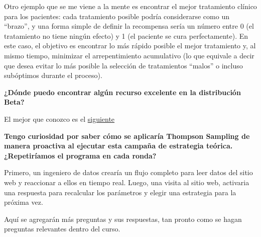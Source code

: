 \documentclass[
]{book}
\begin{document}
Otro ejemplo que se me viene a la mente es encontrar el mejor tratamiento clínico para los pacientes: cada tratamiento posible podría considerarse como un ``brazo'', y una forma simple de definir la recompensa sería un número entre 0 (el tratamiento no tiene ningún efecto) y 1 (el paciente se cura perfectamente). En este caso, el objetivo es encontrar lo más rápido posible el mejor tratamiento y, al mismo tiempo, minimizar el arrepentimiento acumulativo (lo que equivale a decir que desea evitar lo más posible la selección de tratamientos ``malos'' o incluso subóptimos durante el proceso).

\textbf{¿Dónde puedo encontrar algún recurso excelente en la distribución Beta?}

El mejor que conozco es el \href{https://stats.stackexchange.com/questions/47771/what-is-the-intuition-behind-beta-distribution}{siguiente}

\textbf{Tengo curiosidad por saber cómo se aplicaría Thompson Sampling de manera proactiva al ejecutar esta campaña de estrategia teórica. ¿Repetiríamos el programa en cada ronda?}

Primero, un ingeniero de datos crearía un flujo completo para leer datos del sitio web y reaccionar a ellos en tiempo real. Luego, una visita al sitio web, activaria una respuesta para recalcular los parámetros y elegir una estrategia para la próxima vez.

Aquí se agregarán más preguntas y sus respuestas, tan pronto como se hagan preguntas relevantes dentro del curso.

  
\end{document}
